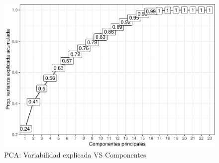 \begin{figure}[!htb]
	\centering
	\includegraphics{imagenes/reduccion_dimension/unnamed-chunk-7-1.pdf}
	\caption{PCA: Variabilidad explicada VS Componentes}
	\label{fig:pca_varexp_comp}
\end{figure}



